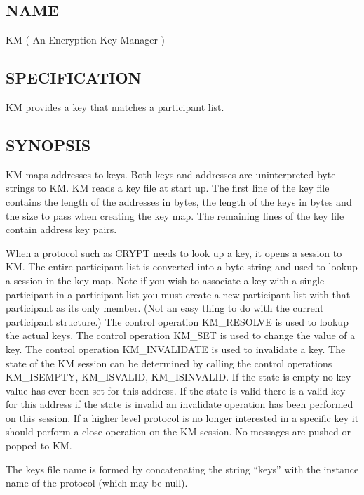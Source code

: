 %
%

\subsection*{NAME}
\label{KM}

\noindent KM ( An Encryption Key Manager )



\subsection*{SPECIFICATION}

\noindent
KM provides a key that matches a participant list. 

\subsection*{SYNOPSIS}
KM maps addresses to keys. Both keys and addresses are 
uninterpreted byte strings to KM. KM reads a key file at start 
up.  The first line of the key file contains the length of the 
addresses in bytes, the length of the keys in bytes and the size 
to pass when creating the key map. The remaining lines of the 
key file contain address key pairs.  

When a protocol such as CRYPT needs to look up a key, it opens 
a session to KM. The entire participant list is converted into a 
byte string and used to lookup a session in the key map. Note if 
you wish to associate a key with a single participant in a 
participant list you must create a new participant list with 
that participant as its only member. (Not an easy thing to do 
with the current participant structure.) The control operation 
KM\_RESOLVE is used to lookup the actual keys. The control 
operation KM\_SET is used to change the value of a key. The 
control operation KM\_INVALIDATE is used to invalidate a key. 
The state of the KM session can be determined by calling the 
control operations KM\_ISEMPTY, KM\_ISVALID, 
KM\_ISINVALID. If the state is empty no key value has ever 
been set for this address. If the state is valid there is a valid 
key for this address if the state is invalid an invalidate 
operation has been performed on this session. If a higher level 
protocol is no longer interested in a specific key it should 
perform a close operation on the KM session.  No messages are 
pushed or popped to KM.

The keys file name is formed by concatenating the string
``keys'' with the instance name of the protocol (which may be 
null).

